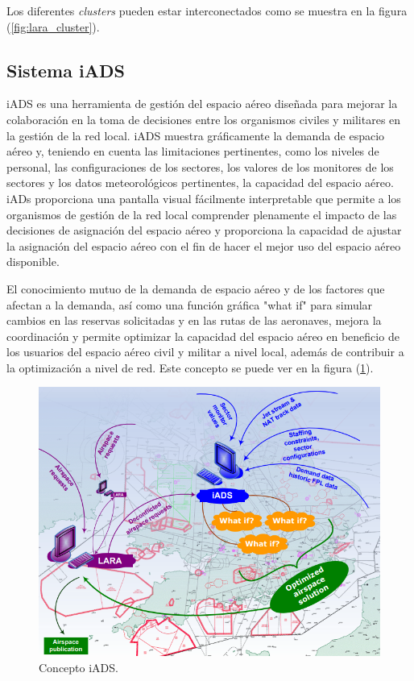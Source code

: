 Los diferentes \textit{clusters} pueden estar interconectados como se muestra en la figura (\ref{fig:lara_cluster}).



\subsection{Sistema iADS}

iADS es una herramienta de gestión del espacio aéreo diseñada para mejorar la colaboración en la toma de decisiones entre los organismos civiles y militares en la gestión de la red local. iADS muestra gráficamente la demanda de espacio aéreo y, teniendo en cuenta las limitaciones pertinentes, como los niveles de personal, las configuraciones de los sectores, los valores de los monitores de los sectores y los datos meteorológicos pertinentes, la capacidad del espacio aéreo. iADs proporciona una pantalla visual fácilmente interpretable que permite a los organismos de gestión de la red local comprender plenamente el impacto de las decisiones de asignación del espacio aéreo y proporciona la capacidad de ajustar la asignación del espacio aéreo con el fin de hacer el mejor uso del espacio aéreo disponible.

El conocimiento mutuo de la demanda de espacio aéreo y de los factores que afectan a la demanda, así como una función gráfica "what if" para simular cambios en las reservas solicitadas y en las rutas de las aeronaves, mejora la coordinación y permite optimizar la capacidad del espacio aéreo en beneficio de los usuarios del espacio aéreo civil y militar a nivel local, además de contribuir a la optimización a nivel de red. Este concepto se puede ver en la figura (\ref{fig:iads}).

\begin{figure}[H]
    \centering
    \includegraphics[width=0.6\linewidth]{figuras/iads.png}
    \caption{Concepto iADS.}
    \label{fig:iads}
\end{figure}

